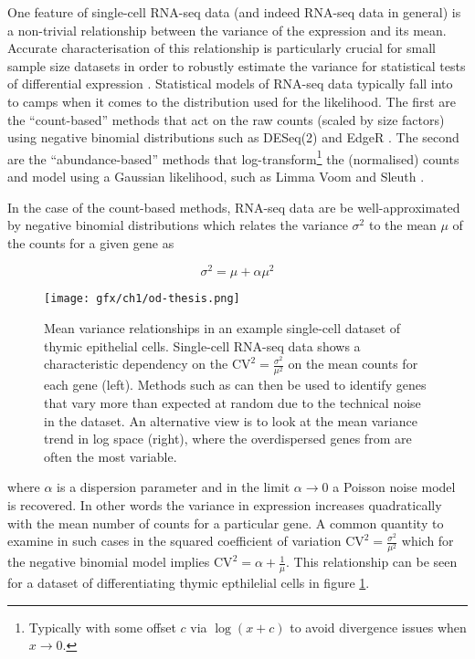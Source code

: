 One feature of single-cell RNA-seq data (and indeed RNA-seq data in general) is a non-trivial relationship between the variance of the expression and its mean. Accurate characterisation of this relationship is particularly crucial for small sample size datasets in order to robustly estimate the variance for statistical tests of differential expression \cite{Robinson2010-rj}. Statistical models of RNA-seq data typically fall into to camps when it comes to the distribution used for the likelihood. The first are the ``count-based'' methods  that act on the raw counts (scaled by size factors) using negative binomial distributions such as DESeq(2) and EdgeR \cite{Anders2010,Robinson2010-rj}. The second are the ``abundance-based'' methods  that log-transform\footnote{
Typically with some offset $c$ via $\log(x+c)$ to avoid divergence issues when $x \rightarrow 0$.
} the (normalised) counts and model using a Gaussian likelihood, such as Limma Voom and Sleuth \cite{Law2014-tu,Pimentel2016-xz}.

In the case of the count-based methods, RNA-seq data are  be well-approximated by negative binomial distributions \cite{Anders2010,Robinson2010-rj,Risso2017-qk} which relates the variance $\sigma^2$ to the mean $\mu$ of the counts for a given gene as

\begin{equation}
  \sigma^2 = \mu + \alpha \mu^2
\end{equation}

\begin{figure}
\centering
  \texttt{[image: gfx/ch1/od-thesis.png]}
  \caption{Mean variance relationships in an example single-cell dataset of thymic epithelial cells. Single-cell RNA-seq data shows a characteristic dependency on the $\text{CV}^2 = \frac{\sigma^2}
{\mu^2}$ on the mean counts for each gene (left). Methods such as \cite{Brennecke2013-xy} can then be used to identify genes that vary more than expected at random due to the technical noise in the dataset. An alternative view is to look at the mean variance trend in log space (right), where the overdispersed genes from \cite{Brennecke2013-xy} are often the most variable.} \label{fig:od}
\end{figure}

where $\alpha$ is a dispersion parameter and in the limit $\alpha \rightarrow 0$ a Poisson noise model is recovered. In other words the variance in expression increases quadratically with the mean number of counts for a particular gene. A common quantity to examine in such cases in the squared coefficient of variation $\text{CV}^2 = \frac{\sigma^2}{\mu^2}$ which for the negative binomial model implies $\text{CV}^2 = \alpha + \frac{1}{\mu}$. This relationship can be seen for a dataset of differentiating thymic epthilelial cells in figure \ref{fig:od}.

